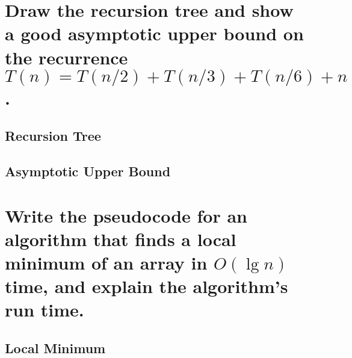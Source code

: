 \section{Draw the recursion tree and show a good asymptotic upper bound on the recurrence $T(n) = T(n/2) + T(n/3) + T(n/6) + n$.}
\subsection{Recursion Tree}
\subsection{Asymptotic Upper Bound}

\section{Write the pseudocode for an algorithm that finds a local minimum of an array in $O(\lg n)$ time, and explain the algorithm's run time.}
\subsection{Local Minimum}



